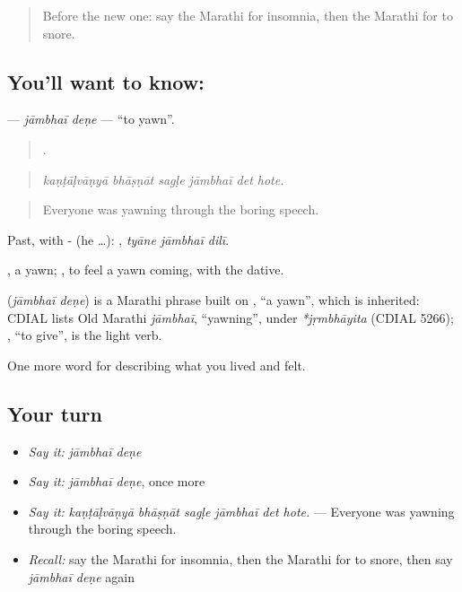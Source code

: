 \label{lesson:MR-C491-jambhai-dene}



\begin{quote}
Before the new one: say the Marathi for insomnia, then the Marathi for to snore.
\end{quote}

\subsection*{You'll want to know:  }
\textbf{ } — \emph{jāmbhaī deṇe} — \textquotedblleft{}to yawn\textquotedblright{}.

\begin{quote}
     .
\end{quote}

\begin{quote}
\emph{kaṇṭāḷvāṇyā bhāṣṇāt sagḷe jāmbhaī det hote.}
\end{quote}

\begin{quote}
Everyone was yawning through the boring speech.
\end{quote}

Past, with - (he …):   , \emph{tyāne jāmbhaī dilī}.

, a yawn;  , to feel a yawn coming, with the dative.

\begin{cousinweb}
\textbf{ } (\emph{jāmbhaī deṇe}) is a Marathi phrase built on , \textquotedblleft{}a yawn\textquotedblright{}, which is inherited: CDIAL lists Old Marathi \emph{jāmbhaī}, \textquotedblleft{}yawning\textquotedblright{}, under \emph{*jṛmbhāyita} (CDIAL 5266); , \textquotedblleft{}to give\textquotedblright{}, is the light verb.
\end{cousinweb}

\begin{grammarlens}[title={What you've built}]
One more word for describing what you lived and felt.
\end{grammarlens}

\subsection*{Your turn}
\begin{itemize}
\raggedright
  \item \emph{Say it:} \emph{jāmbhaī deṇe}
  \item \emph{Say it:} \emph{jāmbhaī deṇe}, once more
  \item \emph{Say it:} \emph{kaṇṭāḷvāṇyā bhāṣṇāt sagḷe jāmbhaī det hote.} — Everyone was yawning through the boring speech.
  \item \emph{Recall:} say the Marathi for insomnia, then the Marathi for to snore, then say \emph{jāmbhaī deṇe} again
\end{itemize}

